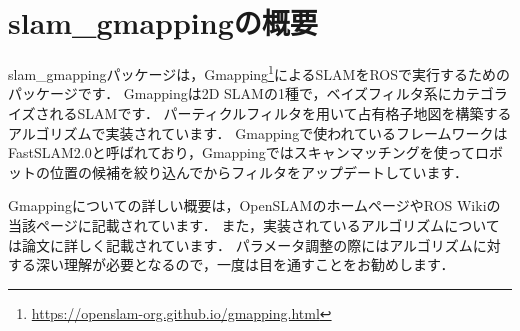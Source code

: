 \documentclass[{../../master}]{subfiles}
\begin{document}
\section{\textsf{slam\_gmapping}の概要}

\textsf{slam\_gmapping}パッケージは，Gmapping\footnote{\url{https://openslam-org.github.io/gmapping.html}}によるSLAMをROSで実行するためのパッケージです．
Gmappingは2D SLAMの1種で，ベイズフィルタ系にカテゴライズされるSLAMです．
パーティクルフィルタを用いて占有格子地図を構築するアルゴリズムで実装されています．
Gmappingで使われているフレームワークはFastSLAM2.0と呼ばれており，\textsf{Gmapping}ではスキャンマッチングを使ってロボットの位置の候補を絞り込んでからフィルタをアップデートしています．

Gmappingについての詳しい概要は，OpenSLAMのホームページやROS Wikiの当該ページに記載されています．
また，実装されているアルゴリズムについては論文\cite{Gmapping}に詳しく記載されています．
パラメータ調整の際にはアルゴリズムに対する深い理解が必要となるので，一度は目を通すことをお勧めします．
\end{document}
